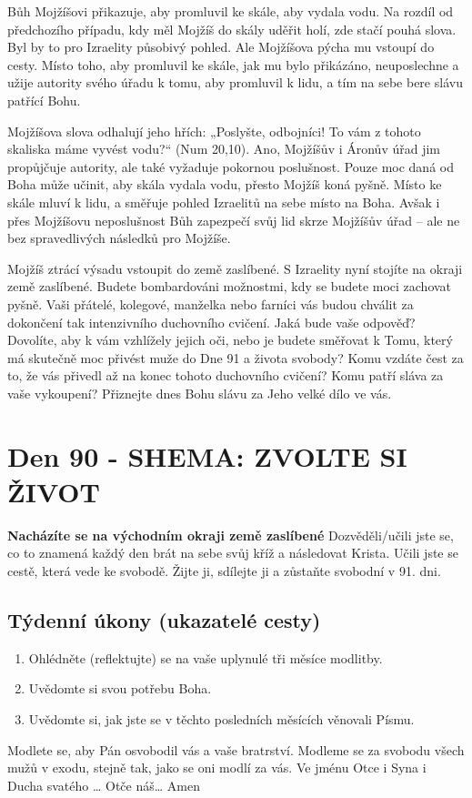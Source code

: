 \documentclass[11pt]{article}
\newcommand{\zacatekTrinactyTyden}{
\textbf{Nacházíte se na východním okraji země zaslíbené} \newline 
Dozvěděli/učili jste se, co to znamená každý den brát na sebe svůj kříž a následovat Krista. Učili jste se cestě, která vede ke svobodě. Žijte ji, sdílejte ji a zůstaňte svobodní v 91. dni.

\subsection*{Týdenní úkony (ukazatelé cesty)}
\begin{enumerate}
  \item Ohlédněte (reflektujte) se na vaše uplynulé tři měsíce modlitby.
  \item Uvědomte si svou potřebu Boha.
  \item Uvědomte si, jak jste se v těchto posledních měsících věnovali Písmu.
\end{enumerate}
Modlete se, aby Pán osvobodil vás a vaše bratrství. \newline
Modleme se za svobodu všech mužů v exodu, stejně tak, jako se oni modlí za vás.\newline
Ve jménu Otce i Syna i Ducha svatého …  Otče náš… Amen
}
\begin{document}
Bůh Mojžíšovi přikazuje, aby promluvil ke skále, aby vydala vodu. Na rozdíl od předchozího případu, kdy měl Mojžíš
do skály uděřit holí, zde stačí pouhá slova. Byl by to pro Izraelity působivý pohled. Ale Mojžíšova pýcha mu vstoupí
do cesty. Místo toho, aby promluvil ke skále, jak mu bylo přikázáno, neuposlechne a užije autority svého úřadu k tomu,
aby promluvil k lidu, a tím na sebe bere slávu patřící Bohu.

Mojžíšova slova odhalují jeho hřích: „Poslyšte, odbojníci! To vám z tohoto skaliska máme vyvést vodu?“ (Num
20,10). Ano, Mojžíšův i Áronův úřad jim propůjčuje autority, ale také vyžaduje pokornou poslušnost. Pouze moc daná
od Boha může učinit, aby skála vydala vodu, přesto Mojžíš koná pyšně. Místo ke skále mluví k lidu, a směřuje pohled
Izraelitů na sebe místo na Boha. Avšak i přes Mojžíšovu neposlušnost Bůh zapezpečí svůj lid skrze Mojžíšův úřad –
ale ne bez spravedlivých následků pro Mojžíše.

Mojžíš ztrácí výsadu vstoupit do země zaslíbené. S Izraelity nyní stojíte na okraji země zaslíbené. Budete
bombardováni možnostmi, kdy se budete moci zachovat pyšně. Vaši přátelé, kolegové, manželka nebo farníci vás
budou chválit za dokončení tak intenzivního duchovního cvičení. Jaká bude vaše odpověď? Dovolíte, aby k vám
vzhlížely jejich oči, nebo je budete směřovat k Tomu, který má skutečně moc přivést muže do Dne 91 a života
svobody? Komu vzdáte čest za to, že vás přivedl až na konec tohoto duchovního cvičení? Komu patří sláva za vaše
vykoupení? Přiznejte dnes Bohu slávu za Jeho velké dílo ve vás.


\newpage
\section{Den 90 - SHEMA: ZVOLTE SI ŽIVOT }
\zacatekTrinactyTyden
\end{document}
